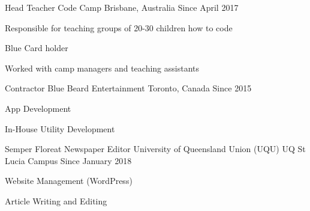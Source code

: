 


\begin{cventries}


\cventry
{Head Teacher} %
{Code Camp} %
{Brisbane, Australia} %
{Since April 2017} %
{ %
\begin{cvitems}
\item {Responsible for teaching groups of 20-30 children how to code}
\item {Blue Card holder}
\item {Worked with camp managers and teaching assistants}
\end{cvitems}
}


\cventry
{Contractor} %
{Blue Beard Entertainment} %
{Toronto, Canada} %
{Since 2015} %
{ %
\begin{cvitems}
\item {App Development}
\item {In-House Utility Development}
\end{cvitems}
}


\cventry
{Semper Floreat Newspaper Editor} %
{University of Queensland Union (UQU)} %
{UQ St Lucia Campus} %
{Since January 2018} %
{ %
\begin{cvitems}
\item {Website Management (WordPress)}
\item {Article Writing and Editing}
\end{cvitems}
}


\end{cventries}